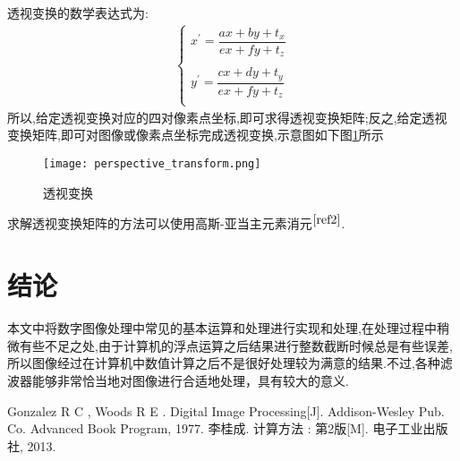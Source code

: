 \documentclass[UTF8,a4paper,10pt]{ctexart}
\begin{document}
\begin{flushleft}
        \hspace{2em}透视变换的数学表达式为:
        \begin{eqnarray}
            \begin{cases}
                x^{\prime}=\dfrac{ax+by+t_{x}}{ex+fy+t_{z}}\\
                \\
                y^{\prime}=\dfrac{cx+dy+t_{y}}{ex+fy+t_{z}}\\
            \end{cases}\nonumber
        \end{eqnarray}
        所以,给定透视变换对应的四对像素点坐标,即可求得透视变换矩阵;反之,给定透视变换矩阵,即可对图像或像素点坐标完成透视变换,示意图如下图\ref{fig:fig_perspective_transformation}所示\\
        \begin{figure}[hbpt]
            \centering
            \texttt{[image: perspective\_transform.png]}
            \caption{透视变换}
            \label{fig:fig_perspective_transformation}
        \end{figure}
        \hspace{2em}求解透视变换矩阵的方法可以使用高斯-亚当主元素消元${}^{\cite{ref2}}$.
        \section{结论}
        \hspace{2em}本文中将数字图像处理中常见的基本运算和处理进行实现和处理,在处理过程中稍微有些不足之处,由于计算机的浮点运算之后结果进行整数截断时候总是有些误差,所以图像经过在计算机中数值计算之后不是很好处理较为满意的结果.不过,各种滤波器能够非常恰当地对图像进行合适地处理，具有较大的意义.
        \begin{thebibliography}{99}  
             Gonzalez R C ,  Woods R E . Digital Image Processing[J]. Addison-Wesley Pub. Co.  Advanced Book Program, 1977. 
             李桂成. 计算方法 : 第2版[M]. 电子工业出版社, 2013.
        \end{thebibliography}
        \newpage
        
    \end{flushleft}
\end{document}
